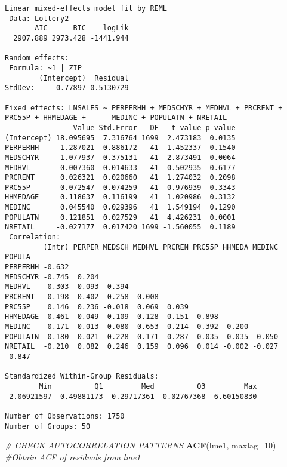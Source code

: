 \documentclass[]{book}
\newenvironment{Shaded}{\begin{snugshade}}{\end{snugshade}}
\newcommand{\CommentTok}[1]{\textcolor[rgb]{0.56,0.35,0.01}{\textit{#1}}}
\newcommand{\DataTypeTok}[1]{\textcolor[rgb]{0.13,0.29,0.53}{#1}}
\newcommand{\DecValTok}[1]{\textcolor[rgb]{0.00,0.00,0.81}{#1}}
\newcommand{\KeywordTok}[1]{\textcolor[rgb]{0.13,0.29,0.53}{\textbf{#1}}}
\newcommand{\NormalTok}[1]{#1}
\begin{document}
\begin{verbatim}
Linear mixed-effects model fit by REML
 Data: Lottery2 
       AIC      BIC    logLik
  2907.889 2973.428 -1441.944

Random effects:
 Formula: ~1 | ZIP
        (Intercept)  Residual
StdDev:     0.77897 0.5130729

Fixed effects: LNSALES ~ PERPERHH + MEDSCHYR + MEDHVL + PRCRENT + PRC55P + HHMEDAGE +      MEDINC + POPULATN + NRETAIL 
                Value Std.Error   DF   t-value p-value
(Intercept) 18.095695  7.316764 1699  2.473183  0.0135
PERPERHH    -1.287021  0.886172   41 -1.452337  0.1540
MEDSCHYR    -1.077937  0.375131   41 -2.873491  0.0064
MEDHVL       0.007360  0.014633   41  0.502935  0.6177
PRCRENT      0.026321  0.020660   41  1.274032  0.2098
PRC55P      -0.072547  0.074259   41 -0.976939  0.3343
HHMEDAGE     0.118637  0.116199   41  1.020986  0.3132
MEDINC       0.045540  0.029396   41  1.549194  0.1290
POPULATN     0.121851  0.027529   41  4.426231  0.0001
NRETAIL     -0.027177  0.017420 1699 -1.560055  0.1189
 Correlation: 
         (Intr) PERPER MEDSCH MEDHVL PRCREN PRC55P HHMEDA MEDINC POPULA
PERPERHH -0.632                                                        
MEDSCHYR -0.745  0.204                                                 
MEDHVL    0.303  0.093 -0.394                                          
PRCRENT  -0.198  0.402 -0.258  0.008                                   
PRC55P    0.146  0.236 -0.018  0.069  0.039                            
HHMEDAGE -0.461  0.049  0.109 -0.128  0.151 -0.898                     
MEDINC   -0.171 -0.013  0.080 -0.653  0.214  0.392 -0.200              
POPULATN  0.180 -0.021 -0.228 -0.171 -0.287 -0.035  0.035 -0.050       
NRETAIL  -0.210  0.082  0.246  0.159  0.096  0.014 -0.002 -0.027 -0.847

Standardized Within-Group Residuals:
        Min          Q1         Med          Q3         Max 
-2.06921597 -0.49881173 -0.29717361  0.02767368  6.60150830 

Number of Observations: 1750
Number of Groups: 50 
\end{verbatim}

\begin{Shaded}
\begin{Highlighting}[]
\CommentTok{# CHECK AUTOCORRELATION PATTERNS}
\KeywordTok{ACF}\NormalTok{(lme1, }\DataTypeTok{maxlag=}\DecValTok{10}\NormalTok{) }\CommentTok{#Obtain ACF of residuals from lme1}
\end{Highlighting}
\end{Shaded}
\end{document}

